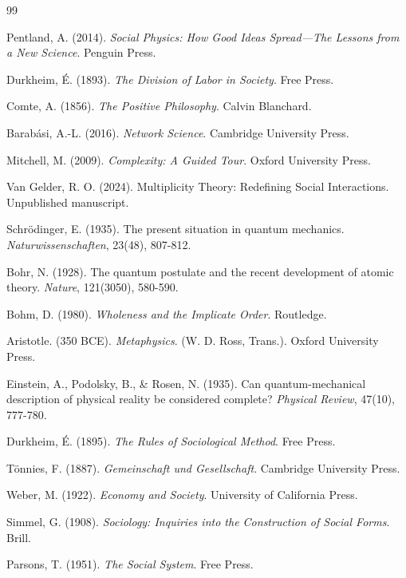 \documentclass[11pt,a4paper]{article}
\begin{document}
\begin{thebibliography}{99}

Pentland, A. (2014). \textit{Social Physics: How Good Ideas Spread—The Lessons from a New Science}. Penguin Press.

Durkheim, É. (1893). \textit{The Division of Labor in Society}. Free Press.

Comte, A. (1856). \textit{The Positive Philosophy}. Calvin Blanchard.

Barabási, A.-L. (2016). \textit{Network Science}. Cambridge University Press.

Mitchell, M. (2009). \textit{Complexity: A Guided Tour}. Oxford University Press.

Van Gelder, R. O. (2024). Multiplicity Theory: Redefining Social Interactions. Unpublished manuscript.

Schrödinger, E. (1935). The present situation in quantum mechanics. \textit{Naturwissenschaften}, 23(48), 807-812.

Bohr, N. (1928). The quantum postulate and the recent development of atomic theory. \textit{Nature}, 121(3050), 580-590.

Bohm, D. (1980). \textit{Wholeness and the Implicate Order}. Routledge.

Aristotle. (350 BCE). \textit{Metaphysics}. (W. D. Ross, Trans.). Oxford University Press.

Einstein, A., Podolsky, B., \& Rosen, N. (1935). Can quantum-mechanical description of physical reality be considered complete? \textit{Physical Review}, 47(10), 777-780.

Durkheim, É. (1895). \textit{The Rules of Sociological Method}. Free Press.

Tönnies, F. (1887). \textit{Gemeinschaft und Gesellschaft}. Cambridge University Press.

Weber, M. (1922). \textit{Economy and Society}. University of California Press.

Simmel, G. (1908). \textit{Sociology: Inquiries into the Construction of Social Forms}. Brill.

Parsons, T. (1951). \textit{The Social System}. Free Press.


\end{thebibliography}
\end{document}
